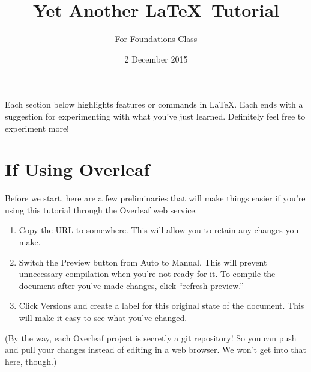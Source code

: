 \documentclass{article}
\title{Yet Another \LaTeX\ Tutorial}
\author{For Foundations Class}
\date{2 December 2015}
\begin{document}

\maketitle


Each section below highlights features or commands in \LaTeX.
Each ends with a suggestion for experimenting with what you've just learned.
Definitely feel free to experiment more!


\section{If Using Overleaf} %
\label{sec:overleaf}        %

Before we start, here are a few preliminaries that will make things easier if you're using this tutorial through the Overleaf web service.

\begin{enumerate}
    \item Copy the URL to somewhere.  This will allow you to retain any changes you make.
    \item Switch the Preview button from Auto to Manual.  This will prevent unnecessary compilation when you're not ready for it.  To compile the document after you've made changes, click ``refresh preview.''
    \item Click Versions and create a label for this original state of the document.  This will make it easy to see what you've changed.
\end{enumerate}

(By the way, each Overleaf project is secretly a git repository!
So you can push and pull your changes instead of editing in a web browser.
We won't get into that here, though.)
\end{document}
